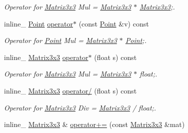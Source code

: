 \begin{DoxyCompactItemize}
\begin{DoxyCompactList}\small\item\em Operator for \hyperlink{class_matrix3x3}{Matrix3x3} Mul = \hyperlink{class_matrix3x3}{Matrix3x3} $\ast$ \hyperlink{class_matrix3x3}{Matrix3x3};. \end{DoxyCompactList}\item 
\hypertarget{class_matrix3x3_ae0459b2a4ceb2fd36e2e2d4e2adc3cb6}{inline\+\_\+ \hyperlink{class_point}{Point} \hyperlink{class_matrix3x3_ae0459b2a4ceb2fd36e2e2d4e2adc3cb6}{operator$\ast$} (const \hyperlink{class_point}{Point} \&v) const }\label{class_matrix3x3_ae0459b2a4ceb2fd36e2e2d4e2adc3cb6}

\begin{DoxyCompactList}\small\item\em Operator for \hyperlink{class_point}{Point} Mul = \hyperlink{class_matrix3x3}{Matrix3x3} $\ast$ \hyperlink{class_point}{Point};. \end{DoxyCompactList}\item 
\hypertarget{class_matrix3x3_aa3d255c9c691eff3528afcd70880a11c}{inline\+\_\+ \hyperlink{class_matrix3x3}{Matrix3x3} \hyperlink{class_matrix3x3_aa3d255c9c691eff3528afcd70880a11c}{operator$\ast$} (float s) const }\label{class_matrix3x3_aa3d255c9c691eff3528afcd70880a11c}

\begin{DoxyCompactList}\small\item\em Operator for \hyperlink{class_matrix3x3}{Matrix3x3} Mul = \hyperlink{class_matrix3x3}{Matrix3x3} $\ast$ float;. \end{DoxyCompactList}\item 
\hypertarget{class_matrix3x3_a8680510944c1491c1d44ae03746935ea}{inline\+\_\+ \hyperlink{class_matrix3x3}{Matrix3x3} \hyperlink{class_matrix3x3_a8680510944c1491c1d44ae03746935ea}{operator/} (float s) const }\label{class_matrix3x3_a8680510944c1491c1d44ae03746935ea}

\begin{DoxyCompactList}\small\item\em Operator for \hyperlink{class_matrix3x3}{Matrix3x3} Div = \hyperlink{class_matrix3x3}{Matrix3x3} / float;. \end{DoxyCompactList}\item 
\hypertarget{class_matrix3x3_afae9d530887621b836dd95428b38ed7c}{inline\+\_\+ \hyperlink{class_matrix3x3}{Matrix3x3} \& \hyperlink{class_matrix3x3_afae9d530887621b836dd95428b38ed7c}{operator+=} (const \hyperlink{class_matrix3x3}{Matrix3x3} \&mat)}\label{class_matrix3x3_afae9d530887621b836dd95428b38ed7c}


\end{DoxyCompactItemize}
